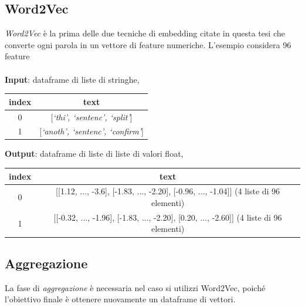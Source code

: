 \documentclass[12pt]{report}
\theoremstyle{definition}
\begin{document}
\subsection{Word2Vec}
\textit{Word2Vec} è la prima delle due tecniche di embedding citate in questa tesi che converte ogni parola in un vettore di feature numeriche.
L'esempio considera 96 feature
\\
\\
\textbf{Input}: dataframe di liste di stringhe,
\begin{center}
    \begin{tabular}{|c|c|}
    \hline
    \textbf{index} & \textbf{text} \\
    \hline
         0 & [\textit{`thi', `sentenc', `split'}]\\
         1 & [\textit{`anoth', `sentenc', `confirm'}]\\
    \hline
    \end{tabular}
\end{center}
\textbf{Output}: dataframe di liste di liste di valori float,
\begin{center}
    \begin{tabular}{|c|c|}
    \hline
    \textbf{index} & \textbf{text} \\
    \hline
         0 & [[1.12, ..., -3.6], [-1.83, ..., -2.20], [-0.96, ..., -1.04]] (4 liste di 96 elementi) \\
         1 & [[-0.32, ..., -1.96], [-1.83, ..., -2.20], [0.20, ..., -2.60]] (4 liste di 96 elementi) \\
    \hline
    \end{tabular}
\end{center}

\subsection{Aggregazione}
La fase di \textit{aggregazione} è necessaria nel caso si utilizzi Word2Vec, poiché l'obiettivo finale è ottenere nuovamente un dataframe di vettori.
\end{document}
